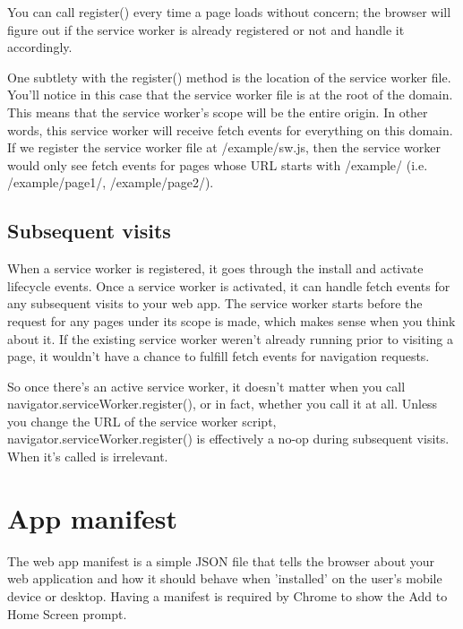 \documentclass[14pt,a4paper,final]{extreport}
\begin{document}
You can call register() every time a page loads without concern; the browser will figure out if the service worker is already registered or not and handle it accordingly.

One subtlety with the register() method is the location of the service worker file. You'll notice in this case that the service worker file is at the root of the domain. This means that the service worker's scope will be the entire origin. In other words, this service worker will receive fetch events for everything on this domain. If we register the service worker file at /example/sw.js, then the service worker would only see fetch events for pages whose URL starts with /example/ (i.e. /example/page1/, /example/page2/).
\subsection{Subsequent visits}
\item When a service worker is registered, it goes through the install and activate lifecycle events. Once a service worker is activated, it can handle fetch events for any subsequent visits to your web app. The service worker starts before the request for any pages under its scope is made, which makes sense when you think about it. If the existing service worker weren't already running prior to visiting a page, it wouldn't have a chance to fulfill fetch events for navigation requests.

So once there's an active service worker, it doesn't matter when you call navigator.serviceWorker.register(), or in fact, whether you call it at all. Unless you change the URL of the service worker script, navigator.serviceWorker.register() is effectively a no-op during subsequent visits. When it's called is irrelevant.
\section{App manifest}
\item The web app manifest is a simple JSON file that tells the browser about your web application and how it should behave when 'installed' on the user's mobile device or desktop. Having a manifest is required by Chrome to show the Add to Home Screen prompt.
\end{document}
